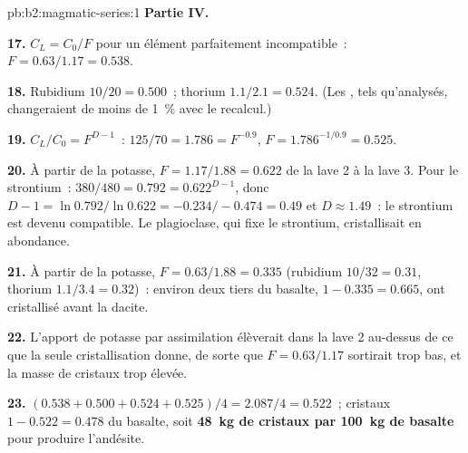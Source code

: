 \begin{solution}{pb:b2:magmatic-series:1}
\noindent\textbf{Partie IV.}

\textbf{17.} $C_L = C_0/F$ pour un élément parfaitement incompatible~: $F = 0.63/1.17 =
0.538$.

\textbf{18.} Rubidium $10/20 = 0.500$~; thorium $1.1/2.1 = 0.524$. (Les , tels qu'analysés, changeraient de moins de \qty{1}{\percent} avec
le recalcul.)

\textbf{19.} $C_L/C_0 = F^{D - 1}$~: $125/70 = 1.786 = F^{-0.9}$, $F = 1.786^{-1/0.9} =
0.525$.

\textbf{20.} À partir de la potasse, $F = 1.17/1.88 = 0.622$ de la lave 2 à la lave 3. Pour le strontium~:
$380/480 = 0.792 = 0.622^{D - 1}$, donc $D - 1 = \ln 0.792/\ln 0.622 = -0.234/-0.474 =
0.49$ et $D \approx 1.49$~: le strontium est devenu compatible. Le plagioclase, qui fixe le strontium,
cristallisait en abondance.

\textbf{21.} À partir de la potasse, $F = 0.63/1.88 = 0.335$ (rubidium $10/32 = 0.31$, thorium
$1.1/3.4 = 0.32$)~: environ deux tiers du basalte, $1 - 0.335 = 0.665$, ont cristallisé
avant la dacite.

\textbf{22.} L'apport de potasse par assimilation élèverait  dans la lave 2 au-dessus de
ce que la seule cristallisation donne, de sorte que $F = 0.63/1.17$ sortirait trop bas, et la masse de
cristaux trop élevée.

\textbf{23.} $(0.538 + 0.500 + 0.524 + 0.525)/4 = 2.087/4 = 0.522$~; cristaux $1 - 0.522
= 0.478$ du basalte, soit \textbf{\qty[text-series-to-math=true]{48}{kg} de
cristaux par \qty{100}{kg} de basalte} pour produire l'andésite.
\end{solution}
